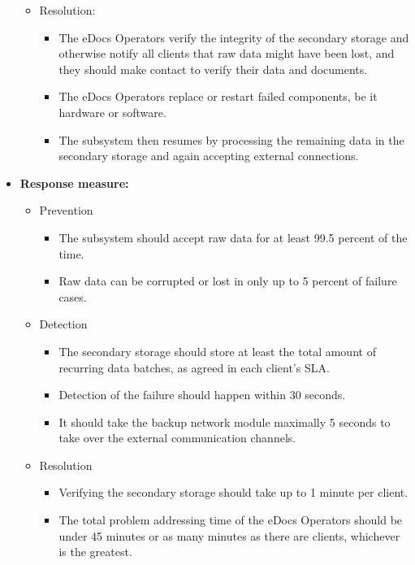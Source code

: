 \documentclass[a4paper,10pt]{article}
\begin{document}
\begin{itemize}
\begin{itemize}
\begin{itemize}
\begin{itemize}
                \end{itemize}
            \end{itemize}
            \item Resolution:
            \begin{itemize}
                \item The eDocs Operators verify the integrity of the secondary storage and otherwise notify all clients that raw data might have been lost, and they should make contact to verify their data and documents.
                \item The eDocs Operators replace or restart failed components, be it hardware or software.
                \item The subsystem then resumes by processing the remaining data in the secondary storage and again accepting external connections.
            \end{itemize}
        \end{itemize}

    \item \textbf{Response measure:}
        \begin{itemize}
            \item Prevention
            \begin{itemize}
                \item The subsystem should accept raw data for at least 99.5 percent of the time.
                \item Raw data can be corrupted or lost in only up to 5 percent of failure cases.
            \end{itemize}
            \item Detection
            \begin{itemize}
                \item The secondary storage should store at least the total amount of recurring data batches, as agreed in each client's SLA.
                \item Detection of the failure should happen within 30 seconds.
                \item It should take the backup network module maximally 5 seconds to take over the external communication channels.
            \end{itemize}
            \item Resolution
            \begin{itemize}
                \item Verifying the secondary storage should take up to 1 minute per client.
                \item The total problem addressing time of the eDocs Operators should be under 45 minutes or as many minutes as there are clients, whichever is the greatest.
            \end{itemize}
        \end{itemize}
\end{itemize}
\end{document}
